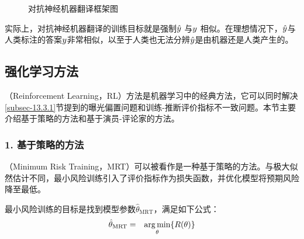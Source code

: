 \begin{figure}[htp]
\centering

\caption{对抗神经机器翻译框架图}
\label{fig:13-10}
\end{figure}

\parinterval 实际上，对抗神经机器翻译的训练目标就是强制$\hat{{y}}$ 与${y}$ 相似。在理想情况下，$\hat{{y}}$与人类标注的答案${y}$非常相似，以至于人类也无法分辨$\hat{{y}}$是由机器还是人类产生的。


\subsection{强化学习方法}

（Reinforcement Learning，RL）方法是机器学习中的经典方法，它可以同时解决\ref{subsec-13.3.1}节提到的曝光偏置问题和训练-推断评价指标不一致问题。本节主要介绍基于策略的方法和基于演员-评论家的方法。


\subsubsection{1. 基于策略的方法}

（Minimum Risk Training，MRT）可以被看作是一种基于策略的方法。与极大似然估计不同，最小风险训练引入了评价指标作为损失函数，并优化模型将预期风险降至最低。

\parinterval 最小风险训练的目标是找到模型参数$\hat{\theta}_{\textrm{MRT}} $，满足如下公式：
\begin{eqnarray}
\hat{\theta}_{\textrm{MRT}} & = & \operatorname*{arg\,min}_{\theta}\{{R}(\theta)\} \label{eq:13-13}
\end{eqnarray}

